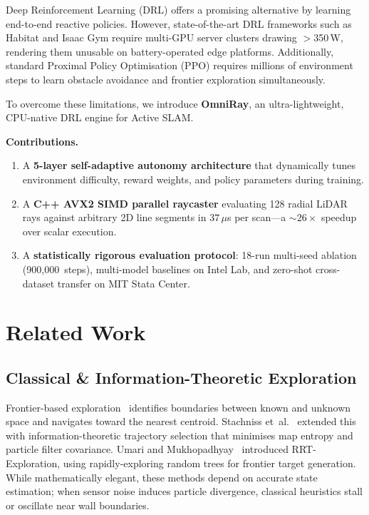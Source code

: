 \documentclass[conference]{IEEEtran}
\begin{document}
Deep Reinforcement Learning (DRL) offers a promising alternative by learning end-to-end reactive policies.
However, state-of-the-art DRL frameworks such as Habitat and Isaac Gym require multi-GPU server clusters drawing $>$350\,W, rendering them unusable on battery-operated edge platforms.
Additionally, standard Proximal Policy Optimisation (PPO) requires millions of environment steps to learn obstacle avoidance and frontier exploration simultaneously.

To overcome these limitations, we introduce \textbf{OmniRay}, an ultra-lightweight, CPU-native DRL engine for Active SLAM.

\noindent\textbf{Contributions.}
\begin{enumerate}
    \item A \textbf{5-layer self-adaptive autonomy architecture} that dynamically tunes environment difficulty, reward weights, and policy parameters during training.
    \item A \textbf{C++ AVX2 SIMD parallel raycaster} evaluating 128 radial LiDAR rays against arbitrary 2D line segments in $37\,\mu$s per scan---a ${\sim}26\times$ speedup over scalar execution.
    \item A \textbf{statistically rigorous evaluation protocol}: 18-run multi-seed ablation (900{,}000~steps), multi-model baselines on Intel Lab, and zero-shot cross-dataset transfer on MIT Stata Center.
\end{enumerate}

\section{Related Work}

\subsection{Classical \& Information-Theoretic Exploration}
Frontier-based exploration~\cite{yamauchi1997} identifies boundaries between known and unknown space and navigates toward the nearest centroid.
Stachniss et~al.~\cite{stachniss2005} extended this with information-theoretic trajectory selection that minimises map entropy and particle filter covariance.
Umari and Mukhopadhyay~\cite{umari2017} introduced RRT-Exploration, using rapidly-exploring random trees for frontier target generation.
While mathematically elegant, these methods depend on accurate state estimation; when sensor noise induces particle divergence, classical heuristics stall or oscillate near wall boundaries.
\end{document}
